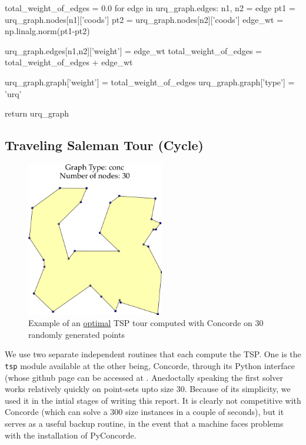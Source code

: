      total_weight_of_edges = 0.0
     for edge in urq_graph.edges:
           n1, n2 = edge
           pt1 = urq_graph.nodes[n1]['coods'] 
           pt2 = urq_graph.nodes[n2]['coods']
           edge_wt = np.linalg.norm(pt1-pt2)

           urq_graph.edges[n1,n2]['weight'] = edge_wt
           total_weight_of_edges = total_weight_of_edges + edge_wt 
     
     urq_graph.graph['weight'] = total_weight_of_edges
     urq_graph.graph['type']   = 'urq'

     return urq_graph
\nwendcode{}\nwdocspar






\subsection{Traveling Saleman Tour (Cycle)}

\begin{figure}[ht]
  \centering
  \includegraphics[width=6cm]{./miscimages/conc-example.png}
  \caption{\label{fig:tsp} Example of an \underline{optimal} TSP tour computed with Concorde  on 30 randomly generated points }
\end{figure}


We use two separate independent routines that each compute the TSP. One is the 
\verb|tsp| module available at 
the other being, Concorde, through its Python interface (whose github page can be accessed at 
. Anedoctally speaking the first solver works relatively 
quickly on point-sets upto size 30. Because of its simplicity, we used it in the intial stages of writing
this report. It is clearly not competitive with Concorde (which can solve a 300 size instances in a couple of seconds), 
but it serves as a useful backup routine, in the event that a machine faces problems with the installation of PyConcorde.

